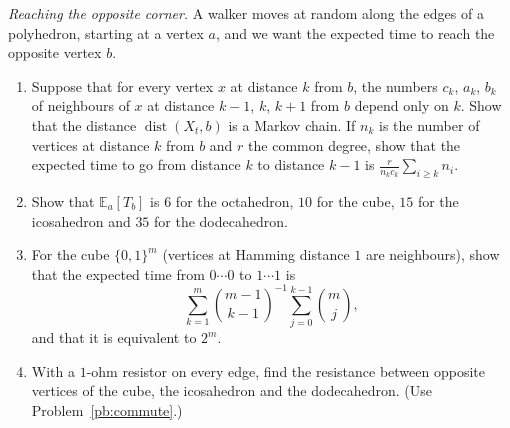 \begin{exercise}[$\star\star$]\label{pb:antipode}
\emph{Reaching the opposite corner.} A walker moves at random along the edges of a polyhedron, starting at a vertex $a$, and we want
the expected time to reach the opposite vertex $b$.
\begin{enumerate}[label=(\alph*)]
\item Suppose that for every vertex $x$ at distance $k$ from $b$, the numbers $c_k$, $a_k$, $b_k$ of neighbours of $x$ at distance $k-1$, $k$, $k+1$ from
$b$ depend only on $k$. Show that the distance $\operatorname{dist}(X_t,b)$ is a Markov chain. If $n_k$ is the number of vertices at distance $k$ from $b$ and $r$ the common
degree, show that the expected time to go from distance $k$ to distance $k-1$ is $\frac r{n_kc_k}\sum_{i\ge k}n_i$.
\item Show that $\mathbb E_a[T_b]$ is $6$ for the octahedron, $10$ for the cube, $15$ for the icosahedron and $35$ for the dodecahedron.
\item For the cube $\{0,1\}^m$ (vertices at Hamming distance $1$ are neighbours), show that the expected time from $0\cdots0$ to $1\cdots1$ is
\[
\sum_{k=1}^m\binom{m-1}{k-1}^{-1}\sum_{j=0}^{k-1}\binom mj,
\]
and that it is equivalent to $2^m$.
\item With a $1$-ohm resistor on every edge, find the resistance between opposite vertices of the cube, the icosahedron and the
dodecahedron. (Use Problem~\ref{pb:commute}.)
\end{enumerate}
\end{exercise}

